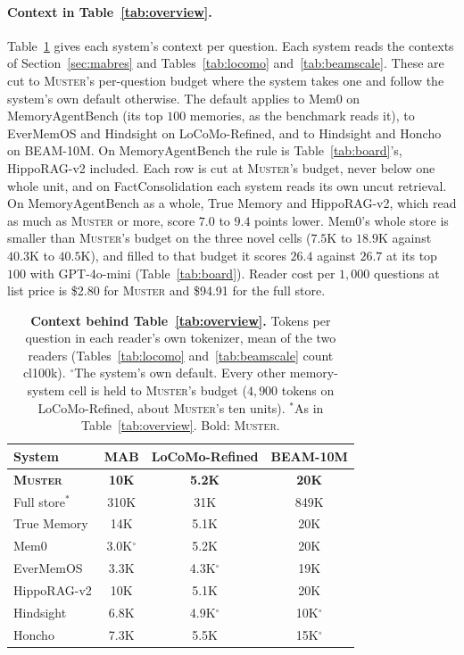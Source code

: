 \documentclass{article}
\newcommand{\ours}{\rowcolor{oursbg}}
\newcommand{\tabfont}{\fontsize{7.5}{8.5}\selectfont\renewcommand{\arraystretch}{1.0}}
\newcommand{\sys}{\textsc{Muster}}
\begin{document}
\paragraph{Context in Table~\ref{tab:overview}.} Table~\ref{tab:overviewctx} gives each system's context per question. Each system reads the contexts of Section~\ref{sec:mabres} and Tables~\ref{tab:locomo} and~\ref{tab:beamscale}. These are cut to \sys{}'s per-question budget where the system takes one and follow the system's own default otherwise. The default applies to Mem0 on MemoryAgentBench (its top $100$ memories, as the benchmark reads it), to EverMemOS and Hindsight on LoCoMo-Refined, and to Hindsight and Honcho on BEAM-10M. On MemoryAgentBench the rule is Table~\ref{tab:board}'s, HippoRAG-v2 included. Each row is cut at \sys{}'s budget, never below one whole unit, and on FactConsolidation each system reads its own uncut retrieval. On MemoryAgentBench as a whole, True Memory and HippoRAG-v2, which read as much as \sys{} or more, score $7.0$ to $9.4$ points lower. Mem0's whole store is smaller than \sys{}'s budget on the three novel cells ($7.5$K to $18.9$K against $40.3$K to $40.5$K), and filled to that budget it scores $26.4$ against $26.7$ at its top $100$ with GPT-4o-mini (Table~\ref{tab:board}). Reader cost per $1{,}000$ questions at list price is \$2.80 for \sys{} and \$94.91 for the full store.

\begin{table}[h]
\centering\tabfont
\caption{\textbf{Context behind Table~\ref{tab:overview}.} Tokens per question in each reader's own tokenizer, mean of the two readers (Tables~\ref{tab:locomo} and~\ref{tab:beamscale} count cl100k). $^\circ$The system's own default. Every other memory-system cell is held to \sys{}'s budget ($4{,}900$ tokens on LoCoMo-Refined, about \sys{}'s ten units). $^\ast$As in Table~\ref{tab:overview}. Bold: \sys{}.}
\label{tab:overviewctx}
\setlength{\tabcolsep}{5pt}
\begin{tabular}{lccc}
\toprule
System & MAB & LoCoMo-Refined & BEAM-10M \\
\midrule
\ours \textbf{\sys{}} & \textbf{10K} & \textbf{5.2K} & \textbf{20K} \\
Full store$^\ast$ & 310K & 31K & 849K \\
True Memory & 14K & 5.1K & 20K \\
Mem0 & 3.0K$^\circ$ & 5.2K & 20K \\
EverMemOS & 3.3K & 4.3K$^\circ$ & 19K \\
HippoRAG-v2 & 10K & 5.1K & 20K \\
Hindsight & 6.8K & 4.9K$^\circ$ & 10K$^\circ$ \\
Honcho & 7.3K & 5.5K & 15K$^\circ$ \\
\bottomrule
\end{tabular}
\end{table}
\end{document}
